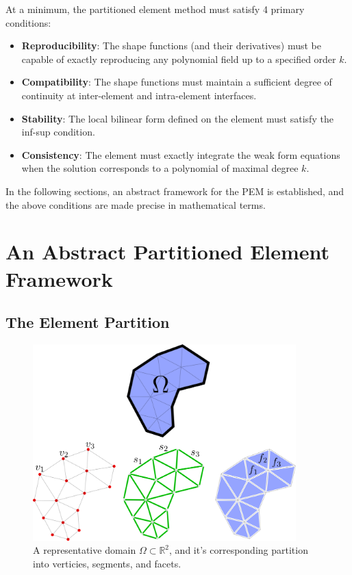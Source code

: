 At a minimum, the partitioned element method must satisfy 4 primary conditions:
\begin{itemize}
	\item \textbf{Reproducibility}: The shape functions (and their derivatives) must be capable of exactly reproducing any polynomial field up to a specified order $k$.
	\item \textbf{Compatibility}: The shape functions must maintain a sufficient degree of continuity at inter-element and intra-element interfaces.
	\item \textbf{Stability}: The local bilinear form defined on the element must satisfy the inf-sup condition.
	\item \textbf{Consistency}: The element must exactly integrate the weak form equations when the solution corresponds to a polynomial of maximal degree $k$.
\end{itemize}

In the following sections, an abstract framework for the PEM is established, and the above conditions are made precise in mathematical terms.

\section{An Abstract Partitioned Element Framework}
\subsection{The Element Partition}


\begin{figure} [!ht]
	\centering
	\includegraphics[width = 4.0in]{figures/partition.png}
	\caption{A representative domain $\Omega \subset \mathbb{R}^2$, and it's corresponding partition into verticies, segments, and facets.}
	\label{fig:partitioned_element}
\end{figure}

